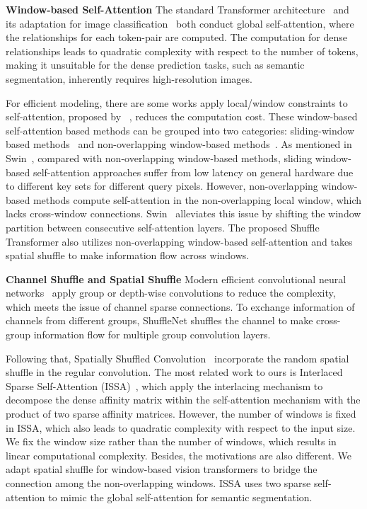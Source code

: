\documentclass{article}
\begin{document}
\noindent\textbf{Window-based Self-Attention}
The standard Transformer architecture~\cite{vaswani2017attention} and its adaptation for image classification~\cite{dosovitskiy2020image} both conduct global self-attention, where the relationships for each token-pair are computed. The computation for dense relationships leads to quadratic complexity with respect to the number of tokens, making it unsuitable for the dense prediction tasks, such as
semantic segmentation, inherently requires high-resolution images.

For efficient modeling, there are some works apply local/window constraints to self-attention, proposed by ~\cite{huang2020ccnetv2,hu2019local,ramachandran2019stand,wang2020axial,child2019generating,liu2021Swin,huang2019interlaced, chu2021twins}, reduces the computation cost. These window-based self-attention based methods can be grouped into two categories: sliding-window based methods~\cite{huang2020ccnetv2,hu2019local,ramachandran2019stand,wang2020axial,child2019generating} and non-overlapping window-based methods~\cite{liu2021Swin,huang2019interlaced}. As mentioned in Swin~\cite{liu2021Swin}, compared with non-overlapping window-based methods, sliding window-based self-attention approaches suffer from low latency on general hardware due to different key sets for different query pixels.
However, non-overlapping window-based methods compute self-attention in the non-overlapping local window, which lacks cross-window connections. Swin~\cite{liu2021Swin} alleviates this issue by shifting the window partition between consecutive self-attention layers. The proposed Shuffle Transformer also utilizes non-overlapping window-based self-attention and takes spatial shuffle to make information flow across windows.

\noindent\textbf{Channel Shuffle and Spatial Shuffle}
Modern efficient convolutional neural networks~\cite{zhang2018shufflenet,han2020ghostnet,sandler2018mobilenetv2} apply group or depth-wise convolutions to reduce the complexity, which meets the issue of channel sparse connections. To exchange information of channels from different groups, ShuffleNet shuffles the channel to make cross-group information flow for multiple group convolution layers.

Following that, Spatially Shuffled Convolution~\cite{kishida2019incorporating} incorporate the random spatial shuffle in the regular convolution. The most related work to ours is Interlaced Sparse Self-Attention (ISSA)~\cite{huang2019interlaced}, which apply the interlacing mechanism to decompose the dense affinity matrix within the self-attention mechanism with the product of two sparse affinity matrices. However, the number of windows is fixed in ISSA, which also leads to quadratic complexity with respect to the input size. We fix the window size rather than the number of windows, which results in linear computational complexity. Besides, the motivations are also different. We adapt spatial shuffle for window-based vision transformers to bridge the connection among the non-overlapping windows. ISSA uses two sparse self-attention to mimic the global self-attention for semantic segmentation.
\end{document}
